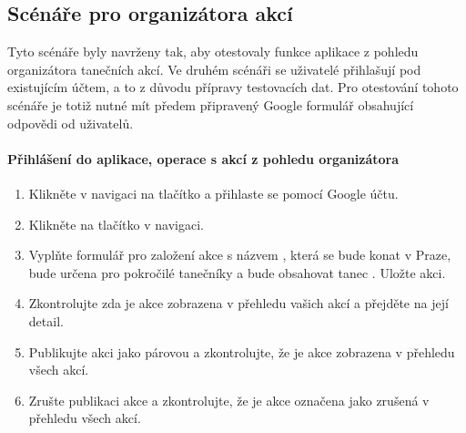 \subsection{Scénáře pro organizátora akcí}
Tyto scénáře byly navrženy tak, aby otestovaly funkce aplikace z pohledu organizátora tanečních akcí. Ve druhém scénáři se uživatelé přihlašují pod existujícím účtem, a to z důvodu přípravy testovacích dat. Pro otestování tohoto scénáře je totiž nutné mít předem připravený Google formulář obsahující odpovědi od uživatelů.

\paragraph*{Přihlášení do aplikace, operace s akcí z pohledu organizátora}
\begin{enumerate}
    \item Klikněte v navigaci na tlačítko  a přihlaste se pomocí Google účtu.
    \item Klikněte na tlačítko  v navigaci.
    \item Vyplňte formulář pro založení akce s názvem , která se bude konat v Praze, bude určena pro pokročilé tanečníky a bude obsahovat tanec . Uložte akci.
    \item Zkontrolujte zda je akce  zobrazena v přehledu vašich akcí a přejděte na její detail.
    \item Publikujte akci jako párovou a zkontrolujte, že je akce zobrazena v přehledu všech akcí.
    \item Zrušte publikaci akce a zkontrolujte, že je akce označena jako zrušená v přehledu všech akcí.
\end{enumerate}

